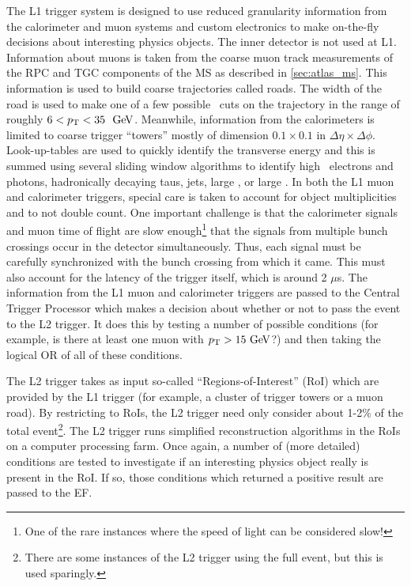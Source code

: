 The L1 trigger system is designed to use reduced granularity information
from the calorimeter and muon systems and custom electronics
to make on-the-fly decisions about interesting physics objects.
The inner detector is not used at L1.
Information about muons is taken from the coarse muon track measurements of 
the RPC and TGC components of the MS
as described in \sec\ref{sec:atlas_ms}. This information is 
used to build coarse trajectories called roads. The width of the road
is used to make one of a few possible \pt~cuts on the 
trajectory in the range of roughly $6<\pt<35~\GeV$. 
Meanwhile, information from the 
calorimeters is limited to coarse trigger ``towers'' mostly of dimension
$0.1 \times 0.1$ in $\Delta\eta \times \Delta\phi$.
Look-up-tables are used to quickly identify the transverse energy 
and this is summed using several sliding window algorithms to identify 
high \pt~electrons and photons, hadronically decaying taus, jets, large \met,
or large \et. 
In both the L1 muon and calorimeter triggers, special care is taken
to account for object multiplicities and to not double count. 
One important challenge is that the 
calorimeter signals and muon time of flight are slow enough\footnote{One
of the rare instances where the speed of light can be considered slow!}
that the signals from multiple bunch crossings occur in the detector
simultaneously.  Thus, each signal must be carefully synchronized with 
the bunch crossing from which it came.  
This must also account for the latency of the trigger itself, which
is around 2 $\mu$s.  The information
from the L1 muon and calorimeter triggers are passed to the Central
Trigger Processor which makes a decision about whether or not to pass
the event to the L2 trigger.  It does this by testing 
a number of possible conditions (for example, is there at least one
muon with $\pt > 15 \GeV$?) and then taking the logical OR of all of
these conditions.

The L2 trigger takes as input so-called ``Regions-of-Interest'' (RoI)
which are provided by the L1 trigger (for example, a cluster of 
trigger towers or a muon road). By restricting to RoIs,
the L2 trigger need only consider about 1-2\% of the 
total event\footnote{There are some instances of the L2 trigger
using the full event, but this is used sparingly.}. 
The L2 trigger runs simplified reconstruction algorithms in the RoIs 
on a computer processing farm. 
Once again, a number of  (more detailed) conditions are tested
to investigate 
if an interesting physics object really is present in the RoI.
If so, those conditions which returned a positive result are 
passed to the EF.

